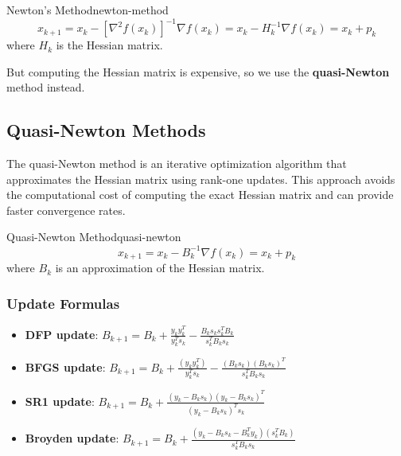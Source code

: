 \begin{definition}{Newton's Method}{newton-method}
  \[
    x_{k+1} = x_k - [\nabla^2 f(x_k)]^{-1} \nabla f(x_k) = x_k - H_k^{-1} \nabla f(x_k) = x_k + p_k
  \]
  where \( H_k \) is the Hessian matrix.
\end{definition}

But computing the Hessian matrix is expensive, so we use the \textbf{quasi-Newton} method instead.

\subsection*{Quasi-Newton Methods}
The quasi-Newton method is an iterative optimization algorithm that approximates the Hessian matrix using rank-one updates.
This approach avoids the computational cost of computing the exact Hessian matrix and can provide faster convergence rates.
\begin{definition}{Quasi-Newton Method}{quasi-newton}
  \[
    x_{k+1} = x_k - B_k^{-1} \nabla f(x_k) = x_k + p_k
  \]
  where \( B_k \) is an approximation of the Hessian matrix.
\end{definition}

\begin{algorithm}[H]
  \caption{Quasi-Newton Method}
  \label{alg:quasi-newton}
  \;
  \;
\end{algorithm}

\subsubsection*{Update Formulas}

\begin{itemize}
  \item \textbf{DFP update}: \( B_{k+1} = B_k + \frac{y_k y_k^T}{y_k^T s_k} - \frac{B_k s_k s_k^T B_k}{s_k^T B_k s_k} \)
  \item \textbf{BFGS update}: \( B_{k+1} = B_k + \frac{(y_k y_k^T)}{y_k^T s_k} - \frac{(B_k s_k)(B_k s_k)^T}{s_k^T B_k s_k} \)
  \item \textbf{SR1 update}: \( B_{k+1} = B_k + \frac{(y_k - B_k s_k)(y_k - B_k s_k)^T}{(y_k - B_k s_k)^T s_k} \)
  \item \textbf{Broyden update}: \( B_{k+1} = B_k + \frac{(y_k - B_k s_k - B_k^T y_k)(s_k^T B_k)}{s_k^T B_k s_k} \)
\end{itemize}

